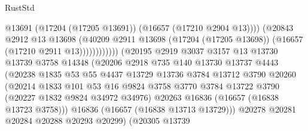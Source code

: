 \begin{lexlean}{RustStd}
\begin{coremodule}
                                            @13691
                                            (@17204 (@17205 @13691))
                                            (@16657 (@17210 @2904 @13))))
                                        (@20843
                                          @2912
                                          @13
                                          @13698
                                          (@40209
                                            @2911
                                            @13698
                                            (@17204 (@17205 @13698))
                                            (@16657 (@17210 @2911 @13))))))))))))
                        (@20195
                          @2919
                          @3037
                          @3157
                          @13
                          @13730
                          @13739
                          @3758
                          @14348
                          (@20206
                            @2918
                            @735
                            @140
                            @13730
                            @13737
                            @4443
                            (@20238
                              @1835
                              @53
                              @55
                              @4437
                              @13729
                              @13736
                              @3784
                              @13712
                              @3790
                              @20260
                              (@20214
                                @1833
                                @101
                                @53
                                @16
                                @9824
                                @3758
                                @3770
                                @3784
                                @13722
                                @3790
                                (@20227 @1832 @9824 @34972 @34976)
                                @20263
                                @16836
                                (@16657 (@16838 @13723 @3758)))
                              @16836
                              (@16657 (@16838 @13713 @13729)))
                            @20278
                            @20281
                            @20284
                            @20288
                            @20293
                            @20299)
                          (@20305
                            @13739

\end{coremodule}
\end{lexlean}
